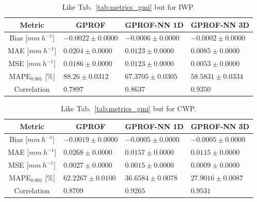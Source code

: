 \documentclass[journal abbreviation, manuscript]{copernicus}
\begin{document}

\begin{table}[hbpt!]
  \centering
\caption{Like Tab.~\ref{tab:metrics_gmi} but for IWP.}
\label{tab:metrics_gmi_iwp}
\begin{tabular}{|c||p{3.5cm}|p{3.5cm}|p{3.5cm}|}
  \hline
  Metric &
  \multicolumn{1}{|c}{GPROF} &
  \multicolumn{1}{|c}{GPROF-NN 1D} &
  \multicolumn{1}{|c|}{GPROF-NN 3D} \\
  \hline\hline
  Bias \hfill [$\unit{mm\ h^{-1}}$]   & \hfill $ -0.0022 \pm 0.0000$ &\hfill $ -0.0006 \pm 0.0000$ &\hfill $ -0.0002 \pm 0.0000$ \\
  MAE \hfill [$\unit{mm\ h^{-1}}$]    & \hfill $  0.0204 \pm 0.0000$ &\hfill $  0.0123 \pm 0.0000$ &\hfill $  0.0085 \pm 0.0000$ \\
  MSE \hfill [$\unit{mm\ h^{-1}}$]    & \hfill $  0.0186 \pm 0.0000$ &\hfill $  0.0123 \pm 0.0000$ &\hfill $  0.0053 \pm 0.0000$ \\
  MAPE$_{0.001}$ \hfill [$\unit{\%}$] & \hfill $ 88.26 \pm 0.0312$ &\hfill $ 67.3705 \pm 0.0305$ &\hfill $ 58.5831 \pm 0.0334$ \\
  Correlation & \hfill $0.7897$ &\hfill $0.8637$ &\hfill $  0.9350$ \\
  \hline
\end{tabular}
\end{table}

\clearpage

\begin{table}[hbpt!]
  \centering
  \caption{Like Tab.~\ref{tab:metrics_gmi} but for CWP.}
  \label{tab:metrics_gmi_cwp}
  \begin{tabular}{|c||p{3.5cm}|p{3.5cm}|p{3.5cm}|}
    \hline
    Metric &
    \multicolumn{1}{|c}{GPROF} &
    \multicolumn{1}{|c}{GPROF-NN 1D} &
    \multicolumn{1}{|c|}{GPROF-NN 3D} \\
    \hline\hline
    Bias \hfill [$\unit{mm\ h^{-1}}$]   & \hfill $ -0.0019 \pm 0.0000$ &\hfill $ -0.0005 \pm 0.0000$ &\hfill $ -0.0005 \pm 0.0000$ \\
    MAE \hfill [$\unit{mm\ h^{-1}}$]    & \hfill $  0.0268 \pm 0.0000$ &\hfill $  0.0157 \pm 0.0000$ &\hfill $  0.0115 \pm 0.0000$ \\
    MSE \hfill [$\unit{mm\ h^{-1}}$]    & \hfill $  0.0027 \pm 0.0000$ &\hfill $  0.0015 \pm 0.0000$ &\hfill $  0.0009 \pm 0.0000$ \\
    MAPE$_{0.001}$ \hfill [$\unit{\%}$]  & \hfill $ 62.2267 \pm 0.0100$ &\hfill $ 36.6584 \pm 0.0078$ &\hfill $ 27.9016 \pm 0.0087$ \\
    Correlation & \hfill $  0.8709$ &\hfill $  0.9265$ &\hfill $  0.9531$ \\
    \hline
  \end{tabular}
\end{table}
\clearpage
\end{document}
